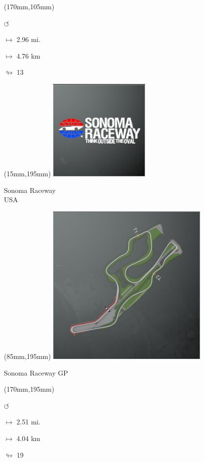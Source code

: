 \begin{textblock*}{30mm}(170mm,105mm)%
\par \Huge$\circlearrowleft$
\Large
\par$\mapsto$ 2.96 mi.
\par$\mapsto$ 4.76 km
\par$\looparrowright$ 13
\end{textblock*}
\begin{textblock*}{60mm}(15mm,195mm)%
\includegraphics[width=50mm]{LG/2015-05-20_00096.png}
\par Sonoma Raceway\\ USA
\end{textblock*}
\begin{textblock*}{80mm}(85mm,195mm)%
\includegraphics[width=80mm]{TR/2015-05-20_00065.png}
\centerline{Sonoma Raceway GP}
\end{textblock*}
\begin{textblock*}{30mm}(170mm,195mm)%
\par \Huge$\circlearrowleft$
\Large
\par$\mapsto$ 2.51 mi.
\par$\mapsto$ 4.04 km
\par$\looparrowright$ 19
\end{textblock*}
\null\newpage

